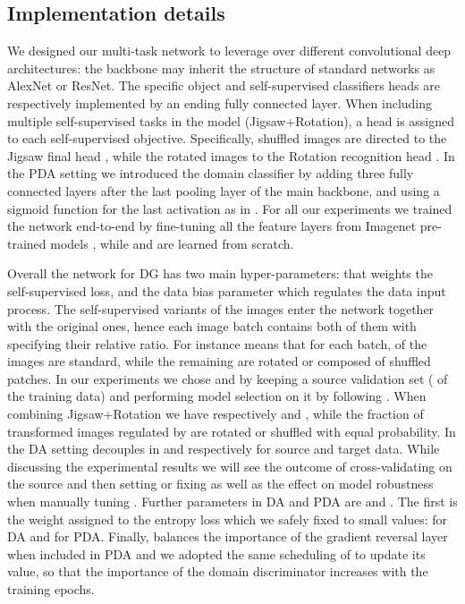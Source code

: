 \subsection{Implementation details}
\label{subsec:implementation}
We designed our multi-task network to leverage over different convolutional deep architectures: the backbone  may inherit the structure of standard networks as AlexNet or ResNet.  
The specific object and self-supervised classifiers heads  are respectively implemented by an ending fully connected layer.
{When including  multiple self-supervised tasks in the model (\ie Jigsaw+Rotation), a  head is assigned to each self-supervised objective. Specifically, shuffled images are directed to the Jigsaw final head  , while the rotated images to the Rotation recognition head .}
In the PDA setting we introduced the domain classifier  by adding three fully connected layers after the last pooling layer of the main backbone, and using a sigmoid function for the last activation as in \cite{Ganin:DANN:JMLR16}. For all our experiments we trained the network end-to-end by fine-tuning all the feature layers from Imagenet pre-trained models \cite{imagenet}, while  and  are learned from scratch. 

Overall the network for DG has two main hyper-parameters:  that weights the self-supervised loss, and the data bias parameter  which regulates the data input process. The self-supervised variants of the images enter the network together with the original ones, hence each image batch contains both of them with  specifying their relative ratio. For instance  means that for each batch,  of the images are standard, while the remaining  are rotated or composed of shuffled patches. {In our experiments we chose  and  by keeping a source validation set ( of the training data) and performing model selection on it by following \cite{anonymous2021in}. 
When combining Jigsaw+Rotation we have respectively  and , while the fraction of transformed images regulated by  are rotated or shuffled with equal probability.
In the DA setting  decouples in  and   respectively for source and target data. While discussing the experimental results we will see the outcome of cross-validating  on the source and then setting  or fixing  as well as the effect on model robustness when manually tuning . 
Further parameters in DA and PDA are  and  . The first is the weight assigned to the entropy loss which we safely fixed to small values:  for DA and  for PDA. Finally,  balances the importance of the gradient reversal layer when included in PDA and we adopted the same scheduling of \cite{Ganin:DANN:JMLR16} to update its value, so that the importance of the domain discriminator increases with the training epochs.}

